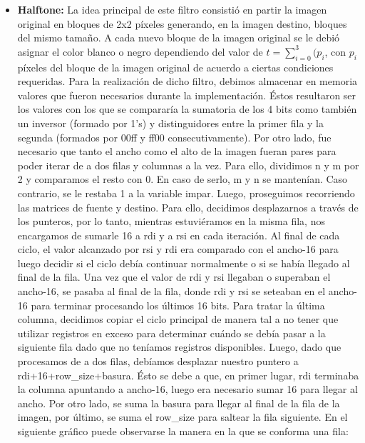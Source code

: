 \documentclass[10pt, a4paper]{article}
\begin{document}
\begin{itemize}
\item {\textbf{Halftone:}}
La idea principal de este filtro consistió en partir la imagen original en bloques de 2x2 píxeles generando, en la imagen destino, bloques del mismo tamaño. A cada nuevo bloque de la imagen original se le debió asignar el color blanco o negro dependiendo del valor de $t = \sum_{i=0}^{3} {(p_{i}}$, con $p_{i}$ píxeles del bloque de la imagen original de acuerdo a ciertas condiciones requeridas.\newline
Para la realización de dicho filtro, debimos almacenar en memoria valores que fueron necesarios durante la implementación. Éstos resultaron ser los valores con los que se compararía la sumatoria de los 4 bits como también un inversor (formado por 1's) y distinguidores entre la primer fila y la segunda (formados por 00ff y ff00 consecutivamente).\newline 
Por otro lado, fue necesario que tanto el ancho como el alto de la imagen fueran pares para poder iterar de a dos filas y columnas a la vez. Para ello, dividimos n y m por 2 y comparamos el resto con 0. En caso de serlo, m y n se mantenían. Caso contrario, se le restaba 1 a la variable impar.\newline
Luego, proseguimos recorriendo las matrices de fuente y destino. Para ello, decidimos desplazarnos a través de los punteros, por lo tanto, mientras estuviéramos en la misma fila, nos encargamos de sumarle 16 a rdi y a rsi en cada iteración. Al final de cada ciclo, el valor alcanzado por rsi y rdi era comparado con el ancho-16 para luego decidir si el ciclo debía continuar normalmente o si se había llegado al final de la fila. Una vez que el valor de rdi y rsi llegaban o superaban el ancho-16, se pasaba al final de la fila, donde rdi y rsi se seteaban en el ancho-16 para terminar procesando los últimos 16 bits. Para tratar la última columna, decidimos copiar el ciclo principal de manera tal a no tener que utilizar registros en exceso para determinar cuándo se debía pasar a la siguiente fila dado que no teníamos registros disponibles.\newline
Luego, dado que procesamos de a dos filas, debíamos desplazar nuestro puntero a rdi+16+row\_size+basura. Ésto se debe a que, en primer lugar, rdi terminaba la columna apuntando a ancho-16, luego era necesario sumar 16 para llegar al ancho. Por otro lado, se suma la basura para llegar al final de la fila de la imagen, por último, se suma el row\_size para saltear la fila siguiente. En el siguiente gráfico puede observarse la manera en la que se conforma una fila:\newline

\end{itemize}
\end{document}
